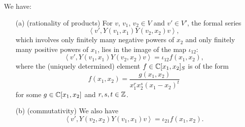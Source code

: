 \documentclass[12pt]{article}
\begin{document}
\begin{propo}\label{rationalityandcommutativity}
We have:
\begin{enumerate}
\item[(a)] (rationality of products) For $v$, $v_{1}$, $v_{2}\in V$
and $v'\in V'$, the formal series
\begin{equation}\label{v'Yv1v2v}
\left\langle v', Y(v_{1}, x_{1})Y(v_{2}, x_{2})v\right\rangle,
\end{equation}
which involves only finitely
many negative powers of $x_{2}$ and only finitely many positive powers
of $x_{1}$, lies in the image of the map $\iota_{12}$:
\begin{equation}\label{Yv1v2}
\left\langle v', Y(v_{1}, x_{1})Y(v_{2}, x_{2})v\right\rangle
=\iota_{12}f(x_{1}, x_{2}),
\end{equation}
where the (uniquely determined) element $f\in {\mathbb{C}}[x_{1},
x_{2}]_{S}$ is of the form
\begin{equation}
f(x_{1}, x_{2})={\displaystyle \frac{g(x_{1},
x_{2})}{x_{1}^{r}x_{2}^{s}(x_{1}-x_{2})^{t}}}
\end{equation}
for some $g\in {\mathbb{C}}[x_{1}, x_{2}]$ and $r, s, t\in {\mathbb{Z}}$.
\item[(b)] (commutativity) We also have 
\begin{equation}\label{Yv2v1}
\left\langle v', Y(v_{2}, x_{2})Y(v_{1}, x_{1})v\right\rangle
=\iota_{21}f(x_{1}, x_{2}).
\end{equation}
\end{enumerate}
\end{propo}
\end{document}
